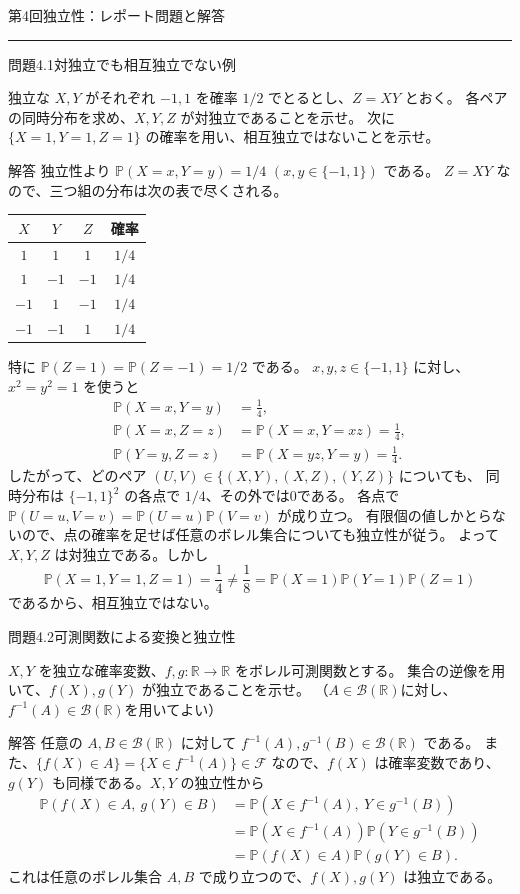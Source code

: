 \documentclass[a4paper,10pt,pdflatex,ja=standard,jafont=ipaex-type1,
  magstyle=real,scale=1]{bxjsarticle}
\newcommand{\topic}[1]{\par\vspace{5pt}
  {\large\sffamily\mdseries\color{accent}#1}\par\vspace{2pt}}
\newcommand{\handouttitle}[1]{%
  \begin{center}
    {\Large\sffamily\mdseries\color{ink}#1}\par\vspace{3mm}
    {\color{accent}\rule{0.88\linewidth}{0.7pt}}
  \end{center}\vspace{-2mm}}
\newcommand{\keybox}[1]{\par\vspace{3pt}\begingroup
  \setlength{\fboxsep}{5pt}
  \colorbox{soft}{\parbox{\dimexpr\linewidth-2\fboxsep\relax}{#1}}%
  \endgroup\par\vspace{2pt}}
\newcommand{\examplelabel}[1]{{\sffamily\mdseries\color{ink}#1}}
\newcommand{\F}{\mathcal F}
\newcommand{\R}{\mathbb R}
\newcommand{\Prob}{\mathbb P}
\begin{document}
\clearpage
\handouttitle{第4回\quad 独立性：レポート問題と解答}

\topic{問題4.1\quad 対独立でも相互独立でない例}
\keybox{独立な $X,Y$ がそれぞれ $-1,1$ を確率 $1/2$ でとるとし、$Z=XY$ とおく。
各ペアの同時分布を求め、$X,Y,Z$ が対独立であることを示せ。
次に $\{X=1,Y=1,Z=1\}$ の確率を用い、相互独立ではないことを示せ。}

\examplelabel{解答}
独立性より $\Prob(X=x,Y=y)=1/4$ $(x,y\in\{-1,1\})$ である。
$Z=XY$ なので、三つ組の分布は次の表で尽くされる。
\begin{center}
  \renewcommand{\arraystretch}{1.15}
  \begin{tabular}{@{}cccc@{}}
    \toprule
    $X$ & $Y$ & $Z$ & 確率\\
    \midrule
    $1$ & $1$ & $1$ & $1/4$\\
    $1$ & $-1$ & $-1$ & $1/4$\\
    $-1$ & $1$ & $-1$ & $1/4$\\
    $-1$ & $-1$ & $1$ & $1/4$\\
    \bottomrule
  \end{tabular}
\end{center}
特に $\Prob(Z=1)=\Prob(Z=-1)=1/2$ である。
$x,y,z\in\{-1,1\}$ に対し、$x^2=y^2=1$ を使うと
$$
  \begin{aligned}
    \Prob(X=x,Y=y)&=\frac14,\\
    \Prob(X=x,Z=z)&=\Prob(X=x,Y=xz)=\frac14,\\
    \Prob(Y=y,Z=z)&=\Prob(X=yz,Y=y)=\frac14.
  \end{aligned}
$$
したがって、どのペア $(U,V)\in\{(X,Y),(X,Z),(Y,Z)\}$ についても、
同時分布は $\{-1,1\}^2$ の各点で $1/4$、その外では0である。
各点で $\Prob(U=u,V=v)=\Prob(U=u)\Prob(V=v)$ が成り立つ。
有限個の値しかとらないので、点の確率を足せば任意のボレル集合についても独立性が従う。
よって $X,Y,Z$ は対独立である。しかし
$$
  \Prob(X=1,Y=1,Z=1)=\frac14
  \ne\frac18=\Prob(X=1)\Prob(Y=1)\Prob(Z=1)
$$
であるから、相互独立ではない。

\topic{問題4.2\quad 可測関数による変換と独立性}
\keybox{$X,Y$ を独立な確率変数、$f,g:\R\to\R$ をボレル可測関数とする。
集合の逆像を用いて、$f(X),g(Y)$ が独立であることを示せ。
（$A\in\mathcal B(\mathbb R)$に対し、$f^{-1}(A)\in\mathcal B(\mathbb R)$を用いてよい）}

\examplelabel{解答}
任意の $A,B\in\mathcal B(\R)$ に対して $f^{-1}(A),g^{-1}(B)\in\mathcal B(\R)$ である。
また、$\{f(X)\in A\}=\{X\in f^{-1}(A)\}\in\F$ なので、$f(X)$ は確率変数であり、
$g(Y)$ も同様である。$X,Y$ の独立性から
$$
  \begin{aligned}
    \Prob(f(X)\in A,\ g(Y)\in B)
    &=\Prob(X\in f^{-1}(A),\ Y\in g^{-1}(B))\\
    &=\Prob(X\in f^{-1}(A))\Prob(Y\in g^{-1}(B))\\
    &=\Prob(f(X)\in A)\Prob(g(Y)\in B).
  \end{aligned}
$$
これは任意のボレル集合 $A,B$ で成り立つので、$f(X),g(Y)$ は独立である。
\end{document}
